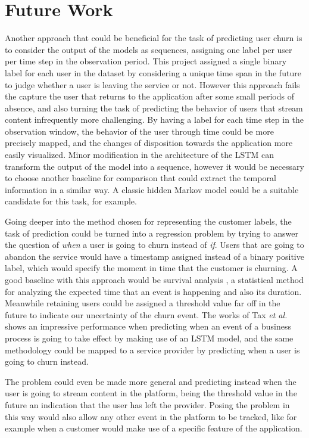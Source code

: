 \documentclass{kththesis}
\begin{document}
\section{Future Work}
\label{sec:future_work}

Another approach that could be beneficial for the task of predicting user churn is to consider the output of the models as sequences, assigning one label per user per time step in the observation period. This project assigned a single binary label for each user in the dataset by considering a unique time span in the future to judge whether a user is leaving the service or not. However this approach fails the capture the user that returns to the application after some small periods of absence, and also turning the task of predicting the behavior of users that stream content infrequently more challenging. By having a label for each time step in the observation window, the behavior of the user through time could be more precisely mapped, and the changes of disposition towards the application more easily visualized. Minor modification in the architecture of the LSTM can transform the output of the model into a sequence, however it would be necessary to choose another baseline for comparison that could extract the temporal information in a similar way. A classic hidden Markov model could be a suitable candidate for this task, for example. 

Going deeper into the method chosen for representing the customer labels, the task of prediction could be turned into a regression problem by trying to answer the question of \emph{when} a user is going to churn instead of \emph{if}. Users that are going to abandon the service would have a timestamp assigned instead of a binary positive label, which would specify the moment in time that the customer is churning. A good baseline with this approach would be survival analysis \citep{ibrahim2005bayesian}, a statistical method for analyzing the expected time that an event is happening and also its duration. Meanwhile retaining users could be assigned a threshold value far off in the future to indicate our uncertainty of the churn event. The works of Tax \emph{et al.} \citep{Tax2016} shows an impressive performance when predicting when an event of a business process is going to take effect by making use of an LSTM model, and the same methodology could be mapped to a service provider by predicting when a user is going to churn instead. 

The problem could even be made more general and predicting instead when the user is going to stream content in the platform, being the threshold value in the future an indication that the user has left the provider. Posing the problem in this way would also allow any other event in the platform to be tracked, like for example when a customer would make use of a specific feature of the application. 
\end{document}
